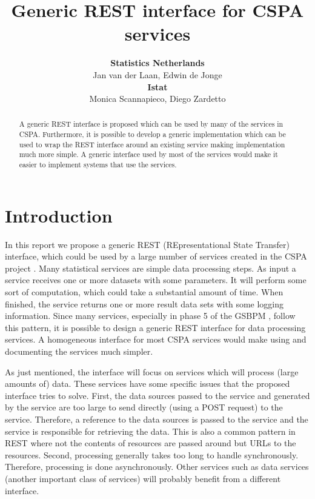 \documentclass[a4paper]{article}
\title{Generic REST interface for CSPA services}
\author{\textbf{Statistics Netherlands}\\ 
Jan van der Laan, Edwin de Jonge\\[1ex]
\textbf{Istat}\\
Monica Scannapieco, Diego Zardetto}
\begin{document}
\maketitle

\begin{abstract}
A generic REST interface is proposed which can be used by many of the services
in CSPA. Furthermore, it is possible to develop a generic implementation which
can be used to wrap the REST interface around an existing service making
implementation much more simple. A generic interface used by most of the
services would make it easier to implement systems that use the services.
\end{abstract}

\section{Introduction}

In this report we propose a generic REST (REpresentational State Transfer)
interface, which could be used by a large number of services created in the
CSPA project \citep{cspa2013}. Many statistical services are simple data
processing steps. As input a service receives one or more datasets with some
parameters. It will perform some sort of computation, which could take a
substantial amount of time.  When finished, the service returns one or more
result data sets with some logging information.  Since many services, especially
in phase 5 of the GSBPM \citep{gsbpm2013}, follow this
pattern, it is possible to design a generic REST interface for data processing
services.  A homogeneous interface for most CSPA services would make using and
documenting the services much simpler. 

As just mentioned, the interface will focus on services which will process (large
amounts of) data. These services have some specific issues that the proposed
interface tries to solve. First, the data sources passed to the service and
generated by the service are too large to send directly (using a POST
request) to the service.  Therefore, a reference to the data sources is passed
to the service and the service is responsible for retrieving the data. This is
also a common pattern in REST where not the contents of resources are passed
around but URLs to the resources.  Second, processing generally takes too long
to handle synchronously. Therefore, processing is done asynchronously.  Other
services such as data services (another important class of services) will
probably benefit from a different interface. 
\end{document}
